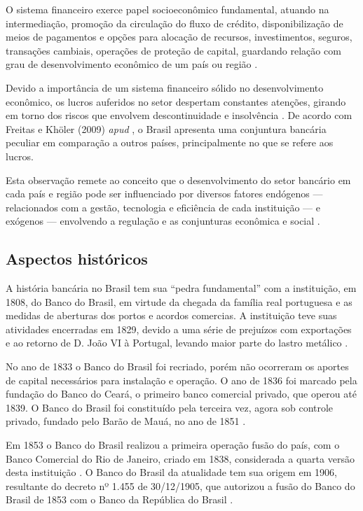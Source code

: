 \documentclass[
  12pt,
  12pt,
  openright,
  oneside,
  a4paper,
  chapter=TITLE,
  section=TITLE,
  subsection=TITLE,
  subsubsection=TITLE,
  english,
  portugues,
  sumario=tradicional]{abntex2}
\begin{document}
O sistema financeiro exerce papel socioeconômico fundamental, atuando na intermediação, promoção da circulação do fluxo de crédito, disponibilização de meios de pagamentos e opções para alocação de recursos, investimentos, seguros, transações cambiais, operações de proteção de capital, guardando relação com grau de desenvolvimento econômico de um país ou região \cite{maffili:2009}.

Devido a importância de um sistema financeiro sólido no desenvolvimento econômico, os lucros auferidos no setor despertam constantes atenções, girando em torno dos riscos que envolvem descontinuidade e insolvência \cite{couto:2002}. De acordo com Freitas e Khöler (2009) \emph{apud} \textcite{dantas:2012}, o Brasil apresenta uma conjuntura bancária peculiar em comparação a outros países, principalmente no que se refere aos lucros.

Esta observação remete ao conceito que o desenvolvimento do setor bancário em cada país e região pode ser influenciado por diversos fatores endógenos --- relacionados com a gestão, tecnologia e eficiência de cada instituição --- e exógenos --- envolvendo a regulação e as conjunturas econômica e social \cite{rover:2011}.

\subsection{Aspectos históricos}

A história bancária no Brasil tem sua ``pedra fundamental'' com a instituição, em 1808, do Banco do Brasil, em virtude da chegada da família real portuguesa e as medidas de aberturas dos portos e acordos comercias. A instituição teve suas atividades encerradas em 1829, devido a uma série de prejuízos com exportações e ao retorno de D. João VI à Portugal, levando maior parte do lastro metálico \cite{costaneto:2004, camargo:2009}.

No ano de 1833 o Banco do Brasil foi recriado, porém não ocorreram os aportes de capital necessários para instalação e operação. O ano de 1836 foi marcado pela fundação do Banco do Ceará, o primeiro banco comercial privado, que operou até 1839. O Banco do Brasil foi constituído pela terceira vez, agora sob controle privado, fundado pelo Barão de Mauá, no ano de 1851 \cite{costaneto:2004, camargo:2009}.

Em 1853 o Banco do Brasil realizou a primeira operação fusão do país, com o Banco Comercial do Rio de Janeiro, criado em 1838, considerada a quarta versão desta instituição \cite{camargo:2009}. O Banco do Brasil da atualidade tem sua origem em 1906, resultante do decreto nº 1.455 de 30/12/1905, que autorizou a fusão do Banco do Brasil de 1853 com o Banco da República do Brasil \cite{camargo:2009, Lei:1455:1905, costaneto:2004}.
\end{document}

